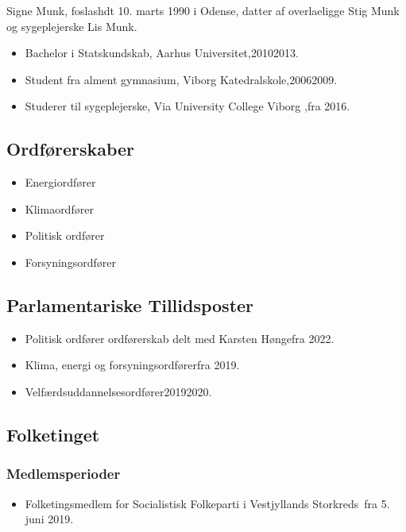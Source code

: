 \documentclass[11pt, a4paper]{awesome-cv}
\begin{document}
\makecvheader[R]
\makelettertitle
\begin{cvletter}
Signe Munk, foslashdt 10. marts 1990 i Odense, datter af overlaeligge Stig Munk og sygeplejerske Lis Munk.

\begin{itemize}
\item Bachelor i Statskundskab, Aarhus Universitet,20102013.
\item Student fra alment gymnasium, Viborg Katedralskole,20062009.
\item Studerer til sygeplejerske, Via University College Viborg ,fra 2016.
\end{itemize}
\subsection*{Ordførerskaber}
\begin{itemize}
\item Energiordfører
\item Klimaordfører
\item Politisk ordfører
\item Forsyningsordfører
\end{itemize}
\subsection*{Parlamentariske Tillidsposter}
\begin{itemize}
\item Politisk ordfører ordførerskab delt med Karsten Høngefra 2022.
\item Klima, energi og forsyningsordførerfra 2019.
\item Velfærdsuddannelsesordfører20192020.
\end{itemize}
\subsection*{Folketinget}
\subsubsection*{Medlemsperioder}
\begin{itemize}
\item Folketingsmedlem for Socialistisk Folkeparti i Vestjyllands Storkreds fra 5. juni 2019.
\end{itemize}

\end{cvletter}
\end{document}
